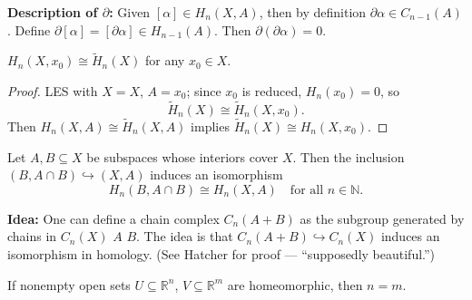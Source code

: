 \documentclass[12pt]{amsart}
\begin{document}
\textbf{Description of $\partial$:} Given $[\alpha] \in H_n(X,A)$, then by definition $\partial\alpha \in C_{n-1}(A)$. Define $\partial[\alpha] = [\partial\alpha] \in H_{n-1}(A)$. Then $\partial(\partial\alpha) = 0$.


\begin{example}
    $H_n(X, x_0) \cong \widetilde{H}_n(X)$ for any $x_0 \in X$.
\end{example}

\begin{proof}
LES with $X = X$, $A = x_0$; since $x_0$ is reduced, $H_n(x_0) = 0$, so
\[
    \widetilde{H}_n(X) \cong \widetilde{H}_n(X, x_0).
\]
Then $H_n(X,A) \cong \widetilde{H}_n(X,A)$ implies $\widetilde{H}_n(X) \cong H_n(X, x_0)$.
\end{proof}

\begin{theorem}[Excision]
    Let $A, B \subseteq X$ be subspaces whose interiors cover $X$. Then the inclusion $(B, A \cap B) \hookrightarrow (X, A)$ induces an isomorphism
    \[
        H_n(B, A \cap B) \cong H_n(X, A) \quad \text{for all } n \in \mathbb{N}.
    \]
\end{theorem}

\textbf{Idea:} One can define a chain complex $C_n(A+B)$ as the subgroup generated by chains in $C_n(X)$  $A$  $B.$
The idea is that $C_n(A+B) \hookrightarrow C_n(X)$ induces an isomorphism in homology. (See Hatcher for proof --- ``supposedly beautiful.'')

\begin{theorem}
    If nonempty open sets $U \subseteq \mathbb{R}^n$, $V \subseteq \mathbb{R}^m$ are homeomorphic, then $n = m$.
\end{theorem}
\end{document}
